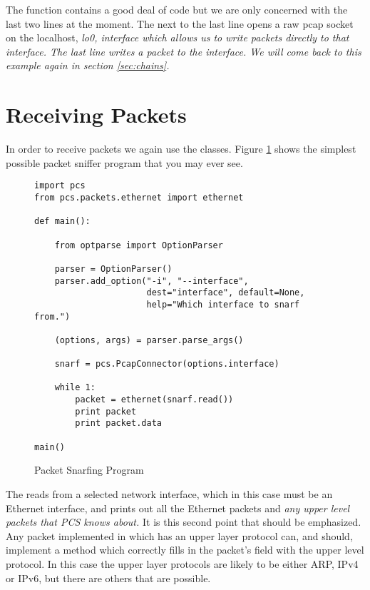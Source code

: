 \documentclass[11pt]{article}
\begin{document}
The  function contains a good deal of code
but we are only concerned with the last two lines at the moment.  The
next to the last line opens a raw pcap socket on the localhost,
\em{lo0}, interface which allows us to write packets directly to that
interface.  The last line writes a packet to the interface.  We will
come back to this example again in section \ref{sec:chains}.

\section{Receiving Packets}
\label{sec:receiving-packets}

In order to receive packets we again use the 
classes.  Figure \ref{fig:packet-snarfing-program} shows the simplest
possible packet sniffer program that you may ever see.

\begin{figure}
  \centering
\begin{lstlisting}
import pcs
from pcs.packets.ethernet import ethernet

def main():

    from optparse import OptionParser

    parser = OptionParser()
    parser.add_option("-i", "--interface",
                      dest="interface", default=None,
                      help="Which interface to snarf from.")
    
    (options, args) = parser.parse_args()

    snarf = pcs.PcapConnector(options.interface)

    while 1:
        packet = ethernet(snarf.read())
        print packet
        print packet.data
        
main()
\end{lstlisting}
  \caption{Packet Snarfing Program}
  \label{fig:packet-snarfing-program}
\end{figure}

The  reads from a selected network interface, which
in this case must be an Ethernet interface, and prints out all the
Ethernet packets and \emph{any upper level packets that PCS knows
  about.}  It is this second point that should be emphasized.  Any
packet implemented in  which has an upper layer protocol
can, and should, implement a  method which correctly
fills in the packet's  field with the upper level
protocol.  In this case the upper layer protocols are likely to be
either ARP, IPv4 or IPv6, but there are others that are possible.
\end{document}
